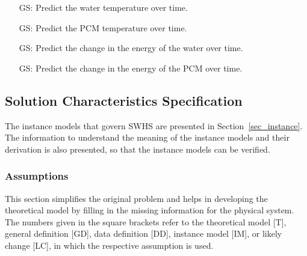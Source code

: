 \documentclass[12pt]{article}
\newcounter{goalnum} %
\newcommand{\progname}{SWHS}
\begin{document}
\begin{itemize}

\item[GS\refstepcounter{goalnum}\thegoalnum \label{G_wtemp}:] Predict the water 
temperature over time.

\item[GS\refstepcounter{goalnum}\thegoalnum \label{G_ptemp}:] Predict the PCM 
temperature over time.
	
\item[GS\refstepcounter{goalnum}\thegoalnum \label{G_wenergy}:] Predict the 
change in the energy of the water over time.

\item[GS\refstepcounter{goalnum}\thegoalnum \label{G_penergy}:] Predict the 
change in the energy of the PCM over time.

\end{itemize}

\subsection{Solution Characteristics Specification}

The instance models that govern \progname{} are presented in
Section~\ref{sec_instance}.  The information to understand the meaning of the
instance models and their derivation is also presented, so that the instance
models can be verified.

\subsubsection{Assumptions}

This section simplifies the original problem and helps in developing the
theoretical model by filling in the missing information for the physical
system. The numbers given in the square brackets refer to the theoretical model
[T], general definition [GD], data definition [DD], instance model [IM], or
likely change [LC], in which the respective assumption is used.
\end{document}
